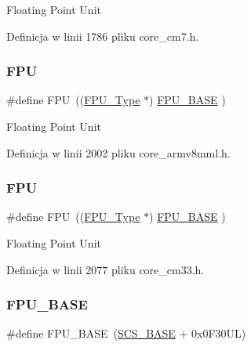 Floating Point Unit 

Definicja w linii 1786 pliku core\+\_\+cm7.\+h.

\mbox{\label{group___c_m_s_i_s__core__base_gabc7c93f2594e85ece1e1a24f10591428}} 
\subsubsection{\texorpdfstring{F\+PU}{FPU}\hspace{0.1cm}{\footnotesize\ttfamily [3/4]}}
{\footnotesize\ttfamily \#define F\+PU~((\hyperlink{struct_f_p_u___type}{F\+P\+U\+\_\+\+Type}       $\ast$)     \hyperlink{group___c_m_s_i_s__core__base_ga4dcad4027118c098c07bcd575f1fbb28}{F\+P\+U\+\_\+\+B\+A\+SE}         )}

Floating Point Unit 

Definicja w linii 2002 pliku core\+\_\+armv8mml.\+h.

\mbox{\label{group___c_m_s_i_s__core__base_gabc7c93f2594e85ece1e1a24f10591428}} 
\subsubsection{\texorpdfstring{F\+PU}{FPU}\hspace{0.1cm}{\footnotesize\ttfamily [4/4]}}
{\footnotesize\ttfamily \#define F\+PU~((\hyperlink{struct_f_p_u___type}{F\+P\+U\+\_\+\+Type}       $\ast$)     \hyperlink{group___c_m_s_i_s__core__base_ga4dcad4027118c098c07bcd575f1fbb28}{F\+P\+U\+\_\+\+B\+A\+SE}         )}

Floating Point Unit 

Definicja w linii 2077 pliku core\+\_\+cm33.\+h.

\mbox{\label{group___c_m_s_i_s__core__base_ga4dcad4027118c098c07bcd575f1fbb28}} 
\subsubsection{\texorpdfstring{F\+P\+U\+\_\+\+B\+A\+SE}{FPU\_BASE}\hspace{0.1cm}{\footnotesize\ttfamily [1/4]}}
{\footnotesize\ttfamily \#define F\+P\+U\+\_\+\+B\+A\+SE~(\hyperlink{group___c_m_s_i_s__core__base_ga3c14ed93192c8d9143322bbf77ebf770}{S\+C\+S\+\_\+\+B\+A\+SE} +  0x0\+F30\+U\+L)}

